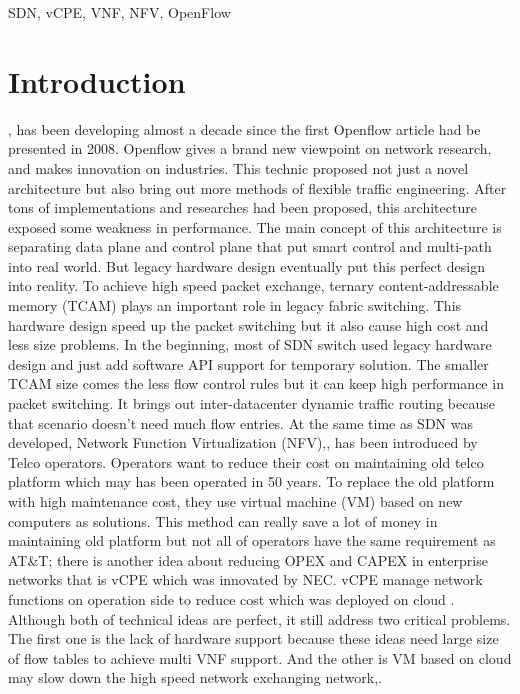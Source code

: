 \documentclass[journal]{IEEEtran}
\begin{document}
\begin{IEEEkeywords}
SDN, vCPE, VNF, NFV, OpenFlow
\end{IEEEkeywords}

\IEEEpeerreviewmaketitle{}


\section{Introduction}
\cite{sdn-new-norm}, \cite{sdn-comprehensive} has been developing almost a decade since the first Openflow article had be presented in 2008\cite{openflow-campus-network}. Openflow\cite{sp:openflow13} gives a brand new viewpoint on network research, and makes innovation on industries. This technic proposed not just a novel architecture but also bring out more methods of flexible traffic engineering. After tons of implementations and researches had been proposed, this architecture exposed some weakness in performance. The main concept of this architecture is separating data plane and control plane that put smart control and multi-path into real world. But legacy hardware design eventually put this perfect design into reality. To achieve high speed packet exchange, ternary content-addressable memory (TCAM) plays an important role in legacy fabric switching. This hardware design speed up the packet switching but it also cause high cost and less size problems.
In the beginning, most of SDN switch used legacy hardware design and just add software API support for temporary solution. The smaller TCAM size comes the less flow control rules but it can keep high performance in packet switching. It brings out inter-datacenter dynamic traffic routing because that scenario doesn’t need much flow entries.
At the same time as SDN was developed, Network Function Virtualization (NFV)\cite{nfvwp},\cite{nfv-survey},\cite{laptop-sdn} has been introduced by Telco operators. Operators want to reduce their cost on maintaining old telco platform which may has been operated in 50 years. To replace the old platform with high maintenance cost, they use virtual machine (VM) based on new computers as solutions. This method can really save a lot of money in maintaining old platform but not all of operators have the same requirement as AT\&T; there is another idea about reducing OPEX and CAPEX in enterprise networks that is vCPE which was innovated by NEC\cite{nec-vcpe}. vCPE manage network functions on operation side to reduce cost which was deployed on cloud \cite{cloud4nfv}. Although both of technical ideas are perfect, it still address two critical problems. The first one is the lack of hardware support because these ideas need large size of flow tables to achieve multi VNF support. And the other is VM based on cloud may slow down the high speed network exchanging network\cite{nfv-placemet},\cite{nfv-placement-model}.
\end{document}
